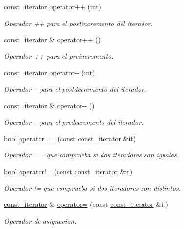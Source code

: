 \begin{DoxyCompactItemize}
\hyperlink{classconjunto_1_1const__iterator}{const\-\_\-iterator} \hyperlink{classconjunto_1_1const__iterator_ae46d81d91f83e0ecd6144177729527d5}{operator++} (int)
\begin{DoxyCompactList}\small\item\em Operador ++ para el postincremento del iterador. \end{DoxyCompactList}\item 
\hyperlink{classconjunto_1_1const__iterator}{const\-\_\-iterator} \& \hyperlink{classconjunto_1_1const__iterator_a9c7e28b4f219a72c5f4cfb9847e53700}{operator++} ()
\begin{DoxyCompactList}\small\item\em Operador ++ para el preincremento. \end{DoxyCompactList}\item 
\hyperlink{classconjunto_1_1const__iterator}{const\-\_\-iterator} \hyperlink{classconjunto_1_1const__iterator_abd13de7dedcc849b0953048409273275}{operator-\/-\/} (int)
\begin{DoxyCompactList}\small\item\em Operador -- para el postdecremento del iterador. \end{DoxyCompactList}\item 
\hyperlink{classconjunto_1_1const__iterator}{const\-\_\-iterator} \& \hyperlink{classconjunto_1_1const__iterator_adeb3b2599c5961e63aa5b48f023fad10}{operator-\/-\/} ()
\begin{DoxyCompactList}\small\item\em Operador -- para el predecremento del iterador. \end{DoxyCompactList}\item 
bool \hyperlink{classconjunto_1_1const__iterator_aa51158e92aeeec4c65ba9a4ba8047cbd}{operator==} (const \hyperlink{classconjunto_1_1const__iterator}{const\-\_\-iterator} \&it)
\begin{DoxyCompactList}\small\item\em Operador == que comprueba si dos iteradores son iguales. \end{DoxyCompactList}\item 
bool \hyperlink{classconjunto_1_1const__iterator_a433c34257914c399d1eff2a1c9b1030d}{operator!=} (const \hyperlink{classconjunto_1_1const__iterator}{const\-\_\-iterator} \&it)
\begin{DoxyCompactList}\small\item\em Operador != que comprueba si dos iteradores son distintos. \end{DoxyCompactList}\item 
\hyperlink{classconjunto_1_1const__iterator}{const\-\_\-iterator} \& \hyperlink{classconjunto_1_1const__iterator_a2af16033daa62935570853989024618e}{operator=} (const \hyperlink{classconjunto_1_1const__iterator}{const\-\_\-iterator} \&it)
\begin{DoxyCompactList}\small\item\em Operador de asignacion. \end{DoxyCompactList}\end{DoxyCompactItemize}
